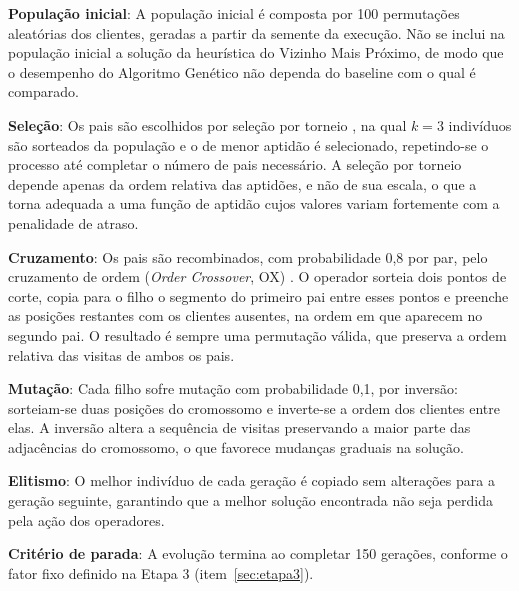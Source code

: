 \begin{alineas}
	\item \textbf{População inicial}: A população inicial é composta por 100
	permutações aleatórias dos clientes, geradas a partir da semente da execução. Não se
	inclui na população inicial a solução da heurística do Vizinho Mais Próximo, de modo
	que o desempenho do Algoritmo Genético não dependa do baseline com o qual é
	comparado.

	\item \textbf{Seleção}: Os pais são escolhidos por seleção por torneio
	\cite{goldberg1989}, na qual $k = 3$ indivíduos são sorteados da população e o de
	menor aptidão é selecionado, repetindo-se o processo até completar o número de pais
	necessário. A seleção por torneio depende apenas da ordem relativa das aptidões, e
	não de sua escala, o que a torna adequada a uma função de aptidão cujos valores
	variam fortemente com a penalidade de atraso.

	\item \textbf{Cruzamento}: Os pais são recombinados, com probabilidade 0,8 por par,
	pelo cruzamento de ordem (\textit{Order Crossover}, OX) \cite{davis1985}. O operador
	sorteia dois pontos de corte, copia para o filho o segmento do primeiro pai entre
	esses pontos e preenche as posições restantes com os clientes ausentes, na ordem em
	que aparecem no segundo pai. O resultado é sempre uma permutação válida, que
	preserva a ordem relativa das visitas de ambos os pais.

	\item \textbf{Mutação}: Cada filho sofre mutação com probabilidade 0,1, por
	inversão: sorteiam-se duas posições do cromossomo e inverte-se a ordem dos clientes
	entre elas. A inversão altera a sequência de visitas preservando a maior parte das
	adjacências do cromossomo, o que favorece mudanças graduais na solução.

	\item \textbf{Elitismo}: O melhor indivíduo de cada geração é copiado sem alterações
	para a geração seguinte, garantindo que a melhor solução encontrada não seja perdida
	pela ação dos operadores.

	\item \textbf{Critério de parada}: A evolução termina ao completar 150 gerações,
	conforme o fator fixo definido na Etapa 3 (item~\ref{sec:etapa3}).
\end{alineas}

